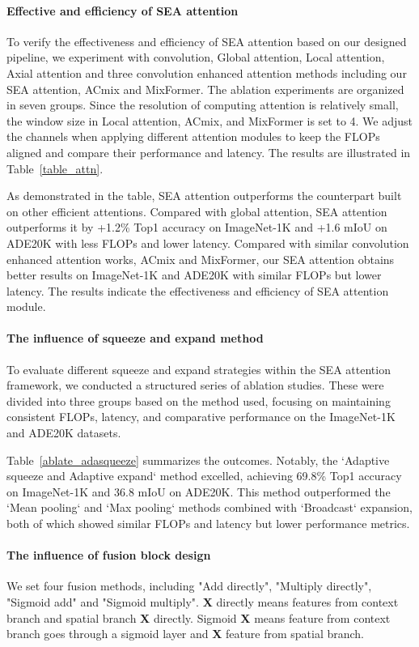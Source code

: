 \paragraph{Effective and efficiency of SEA attention}
To verify the effectiveness and efficiency of SEA attention based on our designed pipeline, we experiment with convolution, Global attention, Local attention, Axial attention and three convolution enhanced attention methods including our SEA attention, ACmix and MixFormer. 
The ablation experiments are organized in seven groups.
Since the resolution of computing attention is relatively small, the window size in Local attention, ACmix, and MixFormer is set to 4.
We adjust the channels when applying different attention modules to keep the FLOPs aligned and compare their performance and latency.
The results are illustrated in Table~\ref{table_attn}.

As demonstrated in the table, SEA attention outperforms the counterpart built on other efficient attentions.
Compared with global attention, SEA attention outperforms it by +1.2\% Top1 accuracy on ImageNet-1K and +1.6 mIoU on ADE20K with less FLOPs and lower latency. 
Compared with similar convolution enhanced attention works, ACmix and MixFormer, our SEA attention obtains better results on ImageNet-1K and ADE20K with similar FLOPs but lower latency. 
The results indicate the effectiveness and efficiency of SEA attention module.


\paragraph{The influence of squeeze and expand method}
To evaluate different squeeze and expand strategies within the SEA attention framework, we conducted a structured series of ablation studies. These were divided into three groups based on the method used, focusing on maintaining consistent FLOPs, latency, and comparative performance on the ImageNet-1K and ADE20K datasets.

Table~\ref{ablate_adasqueeze} summarizes the outcomes. Notably, the `Adaptive squeeze and Adaptive expand` method excelled, achieving 69.8\% Top1 accuracy on ImageNet-1K and 36.8 mIoU on ADE20K. This method outperformed the `Mean pooling` and `Max pooling` methods combined with `Broadcast` expansion, both of which showed similar FLOPs and latency but lower performance metrics.

\paragraph{The influence of fusion block design}
We set four fusion methods, including "Add directly", "Multiply directly", "Sigmoid add" and "Sigmoid multiply". \textbf{X} directly means features from context branch and spatial branch \textbf{X} directly. 
Sigmoid \textbf{X} means feature from context branch goes through a sigmoid layer and \textbf{X} feature from spatial branch.

